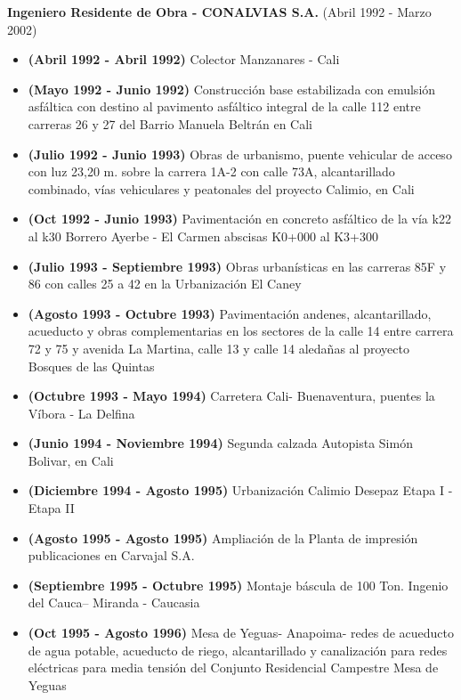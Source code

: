 \documentclass[letterpaper,10pt]{article}
\begin{document}
  \vspace*{0.1cm}
  \textbf{Ingeniero Residente de Obra - CONALVIAS S.A.} (Abril 1992 - Marzo 2002)
  \hfill
  \vspace*{0.1cm}
  \begin{minipage}{\linewidth}
    \begin{itemize}[noitemsep]
      \item \textbf{(Abril 1992 - Abril 1992)} Colector Manzanares - Cali
      \item \textbf{(Mayo 1992 - Junio 1992)} Construcción base estabilizada con emulsión asfáltica con destino al pavimento asfáltico integral de la calle 112 entre carreras 26 y 27 del Barrio Manuela Beltrán en Cali
      \item \textbf{(Julio 1992 - Junio 1993)} Obras de urbanismo, puente vehicular de acceso con luz 23,20 m. sobre la carrera 1A-2 con calle 73A, alcantarillado combinado, vías vehiculares y peatonales del proyecto Calimio, en Cali
      \item \textbf{(Oct 1992 - Junio 1993)} Pavimentación en concreto asfáltico de la vía k22 al k30 Borrero Ayerbe - El Carmen abscisas K0+000 al K3+300
      \item \textbf{(Julio 1993 - Septiembre 1993)} Obras urbanísticas en las carreras 85F y 86 con calles 25 a 42 en la Urbanización El Caney
      \item \textbf{(Agosto 1993 - Octubre 1993)} Pavimentación andenes, alcantarillado, acueducto y obras complementarias en los sectores de la calle 14 entre carrera 72 y 75 y avenida La Martina, calle 13 y calle 14 aledañas al proyecto Bosques de las Quintas
      \item \textbf{(Octubre 1993 - Mayo 1994)} Carretera Cali- Buenaventura, puentes la Víbora - La Delfina
      \item \textbf{(Junio 1994 - Noviembre 1994)} Segunda calzada Autopista Simón Bolivar, en Cali
      \item \textbf{(Diciembre 1994 - Agosto 1995)} Urbanización Calimio Desepaz Etapa I - Etapa II
      \item \textbf{(Agosto 1995 - Agosto 1995)} Ampliación de la Planta de impresión publicaciones en Carvajal S.A. 
      \item \textbf{(Septiembre 1995 - Octubre 1995)} Montaje báscula de 100 Ton. Ingenio del Cauca-- Miranda - Caucasia
      \item \textbf{(Oct 1995 - Agosto 1996)} Mesa de Yeguas- Anapoima- redes de acueducto de agua potable, acueducto de riego, alcantarillado y canalización para redes eléctricas para media tensión del Conjunto Residencial Campestre Mesa de Yeguas

\end{itemize}
\end{minipage}
\end{document}
